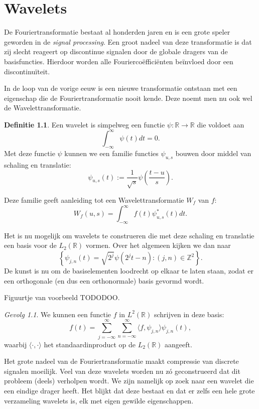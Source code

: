 \documentclass[11pt]{uvamath}
\newcommand{\R}{\mathbb{R}}
\newcommand{\Z}{\mathbb{Z}}
\theoremstyle{plain}
\theoremstyle{definition}
\newtheorem{definitie}[stelling]{Definitie}
\theoremstyle{remark}
\newtheorem{gevolg}{Gevolg}[stelling]
\begin{document}


\chapter{Wavelets}
De Fouriertransformatie bestaat al honderden jaren en is een grote speler geworden in de \emph{signal processing}. Een groot nadeel van deze transformatie is dat zij slecht reageert op discontinue signalen door de globale dragers van de basisfuncties. Hierdoor worden alle Fourierco\"effici\"enten be\"invloed door een discontinu\"iteit.

In de loop van de vorige eeuw is een nieuwe transformatie ontstaan met een eigenschap die de Fouriertransformatie nooit kende. Deze noemt men nu ook wel de Wavelettransformatie.

\begin{definitie}
  Een wavelet is simpelweg een functie $\psi: \R \to \R$ die voldoet aan
  \[
  \int_{-\infty}^{\infty} \psi(t) dt = 0.
  \]
  Met deze functie $\psi$ kunnen we een familie functies $\psi_{u,s}$ bouwen door middel van schaling en translatie:
  \[
  \psi_{u,s}(t) := \frac{1}{\sqrt{s}} \psi\left(\frac{t-u}{s}\right).
  \]
\end{definitie}

Deze familie geeft aanleiding tot een Wavelettransformatie $W_f$ van $f$:
\[
W_f(u,s) = \int_{-\infty}^\infty f(t) \psi^*_{u,s}(t) dt.
\]

Het is nu mogelijk om wavelets te construeren die met deze schaling en translatie een basis voor de $L_2(\R)$ vormen. Over het algemeen kijken we dan naar
\[
\left\{ \psi_{j,n}(t) = \sqrt{2^j} \psi\left( 2^j t - n\right) : (j,n) \in \Z^2 \right\}.
\]
De kunst is nu om de basiselementen loodrecht op elkaar te laten staan, zodat er een orthogonale (en dus een orthonormale) basis gevormd wordt.

Figuurtje van voorbeeld TODODOO.

\begin{gevolg}We kunnen een functie $f$ in $L^2(\R)$ schrijven in deze basis:
  \[
  f(t) = \sum_{j=-\infty}^{\infty} \sum_{n=-\infty}^{\infty} \langle f, \psi_{j,n} \rangle \psi_{j,n}(t),
  \]
  waarbij $\langle \cdot, \cdot \rangle$ het standaardinproduct op de $L_2(\R)$ aangeeft.
\end{gevolg}

Het grote nadeel van de Fouriertransformatie maakt compressie van discrete signalen moeilijk. Veel van deze wavelets worden nu z\'o geconstrueerd dat dit probleem (deels) verholpen wordt. We zijn namelijk op zoek naar een wavelet die een eindige drager heeft. Het blijkt dat deze bestaat en dat er zelfs een hele grote verzameling wavelets is, elk met eigen gewilde eigenschappen.
\end{document}
